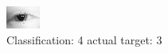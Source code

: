 \begin{figure}[h!]
\begin{center}
\includegraphics[width=0.60\columnwidth]{figures/ID112_class_4_target_3.png}
\end{center}
\caption{ Classification: 4 actual target: 3}
\label{fig:ID112_class_4_target_3}
\end{figure}
